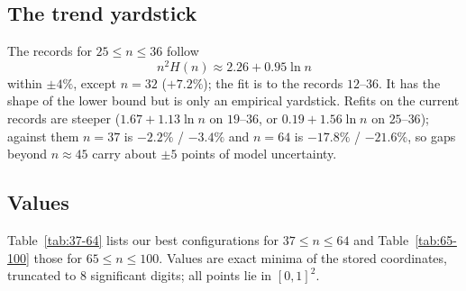 \documentclass[11pt]{amsart}
\theoremstyle{definition}
\newcommand{\sq}{[0,1]^2}
\begin{document}
\subsection{The trend yardstick}
The records for $25 \le n \le 36$ follow
\begin{equation}\label{eq:trend}
  n^2 H(n) \approx 2.26 + 0.95 \ln n
\end{equation}
within $\pm 4\%$, except $n = 32$ ($+7.2\%$); the fit is to the records $12$--$36$. %
It has the shape of the lower bound \cite{KPS82} but is only an empirical yardstick. Refits on the current records are steeper ($1.67 + 1.13\ln n$ on $19$--$36$, or $0.19 + 1.56\ln n$ on $25$--$36$); against them $n = 37$ is $-2.2\%$ / $-3.4\%$ and $n = 64$ is $-17.8\%$ / $-21.6\%$, so gaps beyond $n \approx 45$ carry about $\pm5$ points of model uncertainty. %

\subsection{Values}
Table~\ref{tab:37-64} lists our best configurations for $37 \le n \le 64$ and Table~\ref{tab:65-100} those for $65 \le n \le 100$. Values are exact minima of the stored coordinates, truncated to 8 significant digits; all points lie in $\sq$. %
\end{document}
